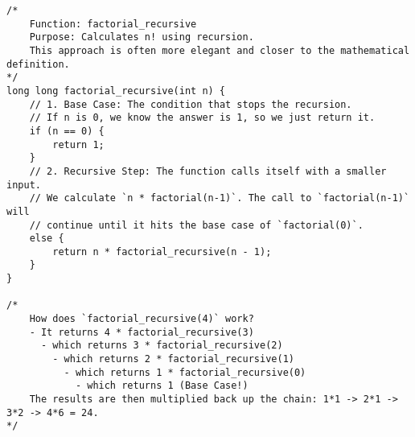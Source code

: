 \documentclass[11pt]{book}
\begin{document}
\begin{verbatim}
/*
    Function: factorial_recursive
    Purpose: Calculates n! using recursion.
    This approach is often more elegant and closer to the mathematical definition.
*/
long long factorial_recursive(int n) {
    // 1. Base Case: The condition that stops the recursion.
    // If n is 0, we know the answer is 1, so we just return it.
    if (n == 0) {
        return 1;
    }
    // 2. Recursive Step: The function calls itself with a smaller input.
    // We calculate `n * factorial(n-1)`. The call to `factorial(n-1)` will
    // continue until it hits the base case of `factorial(0)`.
    else {
        return n * factorial_recursive(n - 1);
    }
}

/*
    How does `factorial_recursive(4)` work?
    - It returns 4 * factorial_recursive(3)
      - which returns 3 * factorial_recursive(2)
        - which returns 2 * factorial_recursive(1)
          - which returns 1 * factorial_recursive(0)
            - which returns 1 (Base Case!)
    The results are then multiplied back up the chain: 1*1 -> 2*1 -> 3*2 -> 4*6 = 24.
*/

\end{verbatim}
\clearpage
\end{document}
